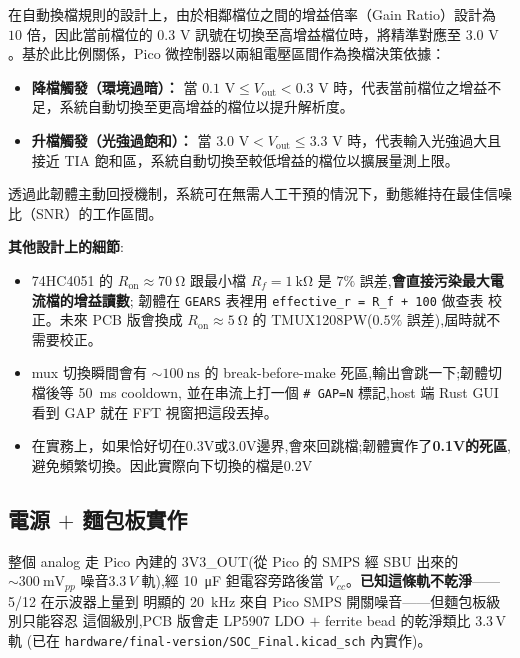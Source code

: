 \documentclass[12pt,a4paper]{article}
\begin{document}
在自動換檔規則的設計上，由於相鄰檔位之間的增益倍率（Gain Ratio）設計為 $10$ 倍，因此當前檔位的 $0.3\text{ V}$ 訊號在切換至高增益檔位時，將精準對應至 $3.0\text{ V}$。基於此比例關係，Pico 微控制器以兩組電壓區間作為換檔決策依據：
\begin{itemize}
	\item \textbf{降檔觸發（環境過暗）：} 當 $0.1\text{ V} \le V_{\text{out}} < 0.3\text{ V}$ 時，代表當前檔位之增益不足，系統自動切換至更高增益的檔位以提升解析度。
	\item \textbf{升檔觸發（光強過飽和）：} 當 $3.0\text{ V} < V_{\text{out}} \le 3.3\text{ V}$ 時，代表輸入光強過大且接近 TIA 飽和區，系統自動切換至較低增益的檔位以擴展量測上限。
\end{itemize}
透過此韌體主動回授機制，系統可在無需人工干預的情況下，動態維持在最佳信噪比（SNR）的工作區間。

\textbf{其他設計上的細節}:

\begin{itemize}[leftmargin=2em,itemsep=0pt]
	\item 74HC4051 的 \(R_\text{on} \approx \SI{70}{\ohm}\) 跟最小檔 \(R_f =
	      \SI{1}{\kilo\ohm}\) 是 \(7\%\) 誤差,\textbf{會直接污染最大電流檔的增益讀數};
	      韌體在 \texttt{GEARS} 表裡用 \texttt{effective\_r = R\_f + 100} 做查表
	      校正。未來 PCB 版會換成 \(R_\text{on} \approx \SI{5}{\ohm}\) 的
	      TMUX1208PW(\(0.5\%\) 誤差),屆時就不需要校正。
	\item mux 切換瞬間會有 \(\sim \SI{100}{\nano\second}\) 的 break-before-make
	      死區,輸出會跳一下;韌體切檔後等 \SI{50}{\milli\second} cooldown,
	      並在串流上打一個 \texttt{\# GAP=N} 標記,host 端 Rust GUI 看到 GAP
	      就在 FFT 視窗把這段丟掉。
	\item 在實務上，如果恰好切在0.3V或3.0V邊界,會來回跳檔;韌體實作了\textbf{0.1V的死區},避免頻繁切換。因此實際向下切換的檔是0.2V
\end{itemize}

\subsection{電源 \(+\) 麵包板實作}

整個 analog 走 Pico 內建的 3V3\_OUT(從 Pico 的 SMPS 經 SBU 出來的 \(\sim
\SI{300}{\milli\volt_{pp}}\) 噪音\(3.3\,V\) 軌),經 \SI{10}{\micro\farad}
鉭電容旁路後當 \(V_{cc}\)。\textbf{已知這條軌不乾淨}——5/12 在示波器上量到
明顯的 \SI{20}{\kilo\hertz} 來自 Pico SMPS 開關噪音——但麵包板級別只能容忍
這個級別,PCB 版會走 LP5907 LDO \(+\) ferrite bead 的乾淨類比 3.3\,V 軌
(已在 \texttt{hardware/final-version/SOC\_Final.kicad\_sch} 內實作)。
\end{document}
